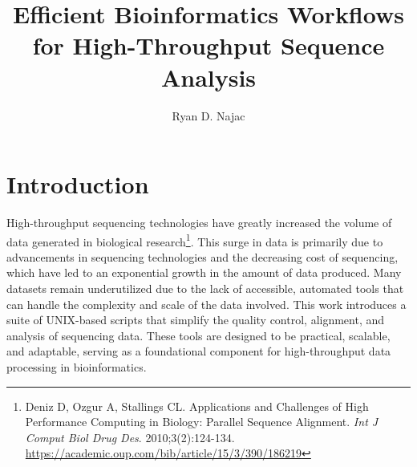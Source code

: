 \documentclass[unnumsec,webpdf,contemporary,large]{oup-authoring-template}%
\theoremstyle{thmstyleone}%
\theoremstyle{thmstyletwo}%
\theoremstyle{thmstylethree}%
\begin{document}

\title[Combinatorial Bioinformatics Meta-Framework]{Efficient Bioinformatics Workflows for High-Throughput Sequence Analysis}

\author[1,$\ast$]{Ryan D. Najac}




\section{Introduction}
High-throughput sequencing technologies have greatly increased the volume of data generated in biological research\footnote{Deniz D, Ozgur A, Stallings CL. Applications and Challenges of High Performance Computing in Biology: Parallel Sequence Alignment. \textit{Int J Comput Biol Drug Des}. 2010;3(2):124-134. \url{https://academic.oup.com/bib/article/15/3/390/186219}}. This surge in data is primarily due to advancements in sequencing technologies and the decreasing cost of sequencing, which have led to an exponential growth in the amount of data produced. Many datasets remain underutilized due to the lack of accessible, automated tools that can handle the complexity and scale of the data involved. This work introduces a suite of UNIX-based scripts that simplify the quality control, alignment, and analysis of sequencing data. These tools are designed to be practical, scalable, and adaptable, serving as a foundational component for high-throughput data processing in bioinformatics.
\end{document}
